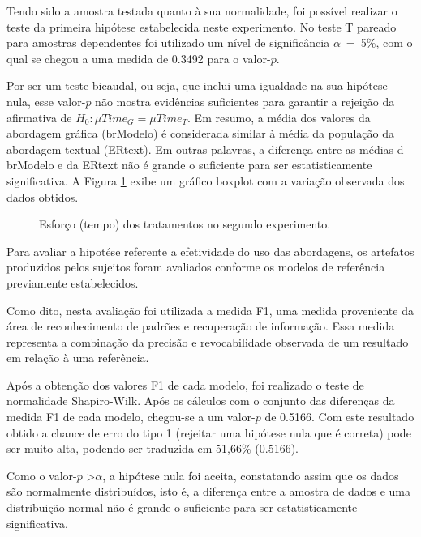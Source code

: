 Tendo sido a amostra testada quanto à sua normalidade, foi possível realizar o teste da primeira hipótese estabelecida neste experimento. 
No teste T pareado para amostras dependentes foi utilizado um nível de significância $\alpha$~=~5\%, com o qual se chegou a uma medida de 0.3492 para o valor-$p$. 

Por ser um teste bicaudal, ou seja, que inclui uma igualdade na sua hipótese nula, esse valor-$p$ não mostra evidências suficientes para garantir a rejeição da afirmativa de $H_0 : \mu Time_G = \mu Time_T$.
Em resumo, a média dos valores da abordagem gráfica (brModelo) é considerada similar à média da população da abordagem textual (ERtext).
Em outras palavras, a diferença entre as médias d brModelo e da ERtext não é grande o suficiente para ser estatisticamente significativa.
A Figura \ref{fig:boxplotTempo2} exibe um gráfico boxplot com a variação observada dos dados obtidos. 


\begin{figure}[!htb]
        \centering
        \caption{Esforço (tempo) dos tratamentos no segundo experimento.}
        \label{fig:boxplotTempo2}
        
\end{figure}



Para avaliar a hipotése referente a efetividade do uso das abordagens, os artefatos produzidos pelos sujeitos foram avaliados conforme os modelos de referência previamente estabelecidos.

Como dito, nesta avaliação foi utilizada a medida F1, uma medida proveniente da área de reconhecimento de padrões e recuperação de informação. 
Essa medida representa a combinação da precisão e revocabilidade observada de um resultado em relação à uma referência.

Após a obtenção dos valores F1 de cada modelo, foi realizado o teste de normalidade Shapiro-Wilk.
Após os cálculos com o conjunto das diferenças da medida F1 de cada modelo, chegou-se a um valor-$p$ de 0.5166.
Com este resultado obtido a chance de erro do tipo 1 (rejeitar uma hipótese nula que é correta) pode ser muito alta, podendo ser traduzida em 51,66\% (0.5166).

Como o valor-$p$ \textgreater $\alpha$, a hipótese nula foi aceita, constatando assim que os dados são normalmente distribuídos, isto é, a diferença entre a amostra de dados e uma distribuição normal não é grande o suficiente para ser estatisticamente significativa.

